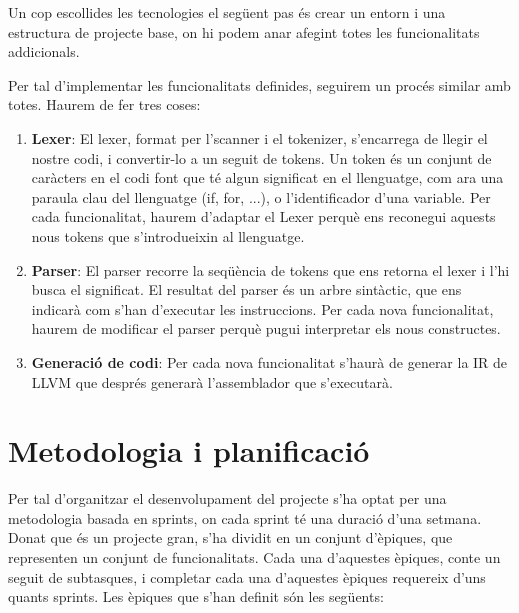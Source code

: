 ﻿\documentclass{article}
\begin{document}
Un cop escollides les tecnologies el següent pas és crear un entorn i una
estructura de projecte base, on hi podem anar afegint totes les funcionalitats
addicionals.

Per tal d'implementar les funcionalitats definides, seguirem un procés similar
amb totes. Haurem de fer tres coses:

\begin{enumerate}
    \item \textbf{Lexer}: El lexer, format per l'scanner i el tokenizer,
        s'encarrega de llegir el nostre codi, i convertir-lo a un seguit de 
        tokens. Un token és un conjunt de caràcters en el codi font que té algun 
        significat en el llenguatge, com ara una paraula clau del llenguatge 
        (if, for, ...), o l'identificador d'una variable. Per cada funcionalitat, 
        haurem d'adaptar el Lexer perquè ens reconegui aquests nous tokens que
        s'introdueixin al llenguatge.
    \item \textbf{Parser}: El parser recorre la seqüència de tokens que ens
        retorna el lexer i l'hi busca el significat. El resultat del parser és
        un arbre sintàctic, que ens indicarà com s'han d'executar les instruccions.
        Per cada nova funcionalitat, haurem de modificar el parser perquè pugui
        interpretar els nous constructes.
    \item \textbf{Generació de codi}: Per cada nova funcionalitat s'haurà de 
        generar la IR de LLVM que després generarà l'assemblador que s'executarà.
\end{enumerate}


\section{Metodologia i planificació}
Per tal d'organitzar el desenvolupament del projecte s'ha optat per una metodologia
basada en sprints, on cada sprint té una duració d'una setmana. Donat que és un
projecte gran, s'ha dividit en un conjunt d'èpiques, que representen un conjunt
de funcionalitats. Cada una d'aquestes èpiques, conte un seguit de subtasques, i
completar cada una d'aquestes èpiques requereix d'uns quants sprints. Les èpiques
que s'han definit són les següents:
\end{document}
